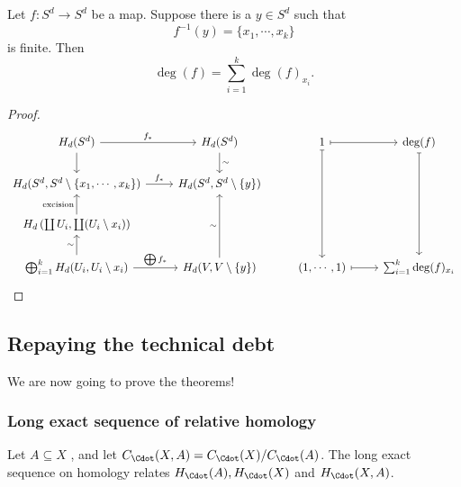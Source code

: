 \documentclass[a4paper]{article}
\begin{document}
\begin{thm}
  Let $f: S^d \to S^d$ be a map. Suppose there is a $y \in S^d$ such that
  \[
    f^{-1}(y) = \{x_1, \cdots, x_k\}
  \]
  is finite. Then
  \[
    \deg (f) = \sum_{i = 1}^k \deg(f)_{x_i}.
  \]
\end{thm}

\begin{proof}
  \[
    \begin{tikzcd}
      H_d(S^d) \ar[r, "f_*"] \ar[d] & H_d(S^d) \ar[d, "\sim"] & 1 \ar[r, maps to] \ar[ddd, maps to]& \deg(f) \ar[ddd, maps to]\\
      H_d(S^d, S^d \setminus \{x_1, \cdots, x_k\}) \ar[r, "f_*"] & H_d(S^d, S^d \setminus \{y\})\\
      H_d\left(\coprod U_i, \coprod (U_i \setminus x_i)\right) \ar[u, "\text{excision}"]\\
      \bigoplus_{i = 1}^ k H_d(U_i, U_i \setminus x_i) \ar[r, "\bigoplus f_*"] \ar[u, "\sim"] & H_d(V, V\setminus \{y\}) \ar[uu, "\sim"] & (1, \cdots, 1) \ar[r, maps to] & \sum_{i = 1}^k \deg(f)_{x_i}
    \end{tikzcd}
  \]
\end{proof}
\subsection{Repaying the technical debt}
We are now going to prove the theorems!

\subsubsection*{Long exact sequence of relative homology}
Let $A \subseteq X$ , and let $C_{\Cdot}(X, A) = C_{\Cdot}(X)/C_{\Cdot}(A)$. The long exact sequence on homology relates $H_{\Cdot}(A), H_{\Cdot}(X)$ and $H_{\Cdot}(X, A)$.
\end{document}
